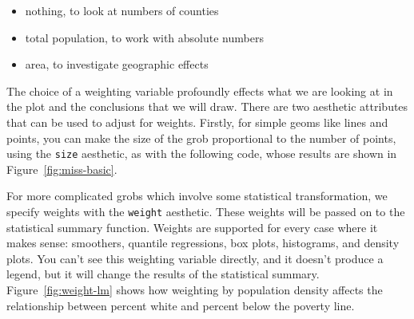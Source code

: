 \begin{itemize}
  \item nothing, to look at numbers of counties
  \item total population, to work with absolute numbers
  \item area, to investigate geographic effects
\end{itemize}

\noindent The choice of a weighting variable profoundly effects what we are looking at in the plot and the conclusions that we will draw.  There are two aesthetic attributes that can be used to adjust for weights.  Firstly, for simple geoms like lines and points, you can make the size of the grob proportional to the number of points, using the {\tt size} aesthetic, as with the following code, whose results are shown in Figure~\ref{fig:miss-basic}.

%


For more complicated grobs which involve some statistical transformation, we specify weights with the {\tt weight} aesthetic.  These weights will be passed on to the statistical summary function.  Weights are supported for every case where it makes sense: smoothers, quantile regressions, box plots, histograms, and density plots.  You can't see this weighting variable directly, and it doesn't produce a legend, but it will change the results of the statistical summary.  Figure~\ref{fig:weight-lm} shows how weighting by population density affects the relationship between percent white and percent below the poverty line.

%


